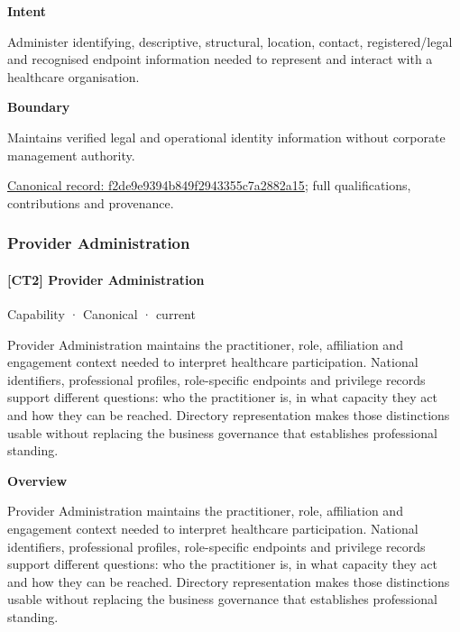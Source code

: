 \textbf{Intent}



Administer identifying, descriptive, structural, location, contact, registered/legal and recognised endpoint information needed to represent and interact with a healthcare organisation.



\textbf{Boundary}



Maintains verified legal and operational identity information without corporate management authority.


{\footnotesize \href{../../../../continuum/strategy/capability/f2de9e9394b849f2943355c7a2882a15.md}{Canonical record: f2de9e9394b849f2943355c7a2882a15}; full qualifications, contributions and provenance.}\par
\subsubsection{Provider Administration}

\paragraph{[CT2] Provider Administration}

\label{element:d6312f85968a4209bafff5ed009297a6}
{\small Capability · Canonical · current}\par

Provider Administration maintains the practitioner, role, affiliation and engagement context needed to interpret healthcare participation. National identifiers, professional profiles, role-specific endpoints and privilege records support different questions: who the practitioner is, in what capacity they act and how they can be reached. Directory representation makes those distinctions usable without replacing the business governance that establishes professional standing.



\textbf{Overview}



Provider Administration maintains the practitioner, role, affiliation and engagement context needed to interpret healthcare participation. National identifiers, professional profiles, role-specific endpoints and privilege records support different questions: who the practitioner is, in what capacity they act and how they can be reached. Directory representation makes those distinctions usable without replacing the business governance that establishes professional standing.



